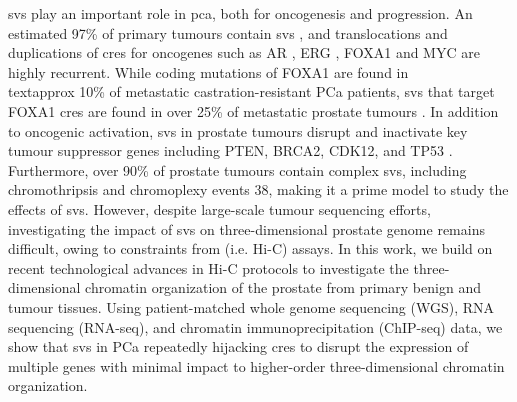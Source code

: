 \glspl{sv} play an important role in \gls{pca}, both for oncogenesis and progression.
An estimated 97\% of primary tumours contain \glspl{sv} \cite{liPatternsSomaticStructural2020,fraserGenomicHallmarksLocalized2017}, and translocations and duplications of \glspl{cre} for oncogenes such as AR \cite{takedaSomaticallyAcquiredEnhancer2018}, ERG \cite{rosenClinicalPotentialERG2012}, FOXA1 \cite{quigleyGenomicHallmarksStructural2018,paroliaDistinctStructuralClasses2019} and MYC \cite{paroliaDistinctStructuralClasses2019} are highly recurrent.
While coding mutations of FOXA1 are found in \\textapprox 10\% of metastatic castration-resistant PCa patients, \glspl{sv} that target FOXA1 \glspl{cre} are found in over 25\% of metastatic prostate tumours \cite{paroliaDistinctStructuralClasses2019}.
In addition to oncogenic activation, \glspl{sv} in prostate tumours disrupt and inactivate key tumour suppressor genes including PTEN, BRCA2, CDK12, and TP53 \cite{quigleyGenomicHallmarksStructural2018,abeshouseMolecularTaxonomyPrimary2015}.
Furthermore, over 90\% of prostate tumours contain complex \glspl{sv}, including chromothripsis and chromoplexy events 38, making it a prime model to study the effects of \glspl{sv}.
However, despite large-scale tumour sequencing efforts, investigating the impact of \glspl{sv} on three-dimensional prostate genome remains difficult, owing to constraints from  (i.e. Hi-C) assays.
In this work, we build on recent technological advances in Hi-C protocols to investigate the three-dimensional chromatin organization of the prostate from primary benign and tumour tissues.
Using patient-matched whole genome sequencing (WGS), RNA sequencing (RNA-seq), and chromatin immunoprecipitation (ChIP-seq) data, we show that \glspl{sv} in PCa repeatedly hijacking \glspl{cre} to disrupt the expression of multiple genes with minimal impact to higher-order three-dimensional chromatin organization.
